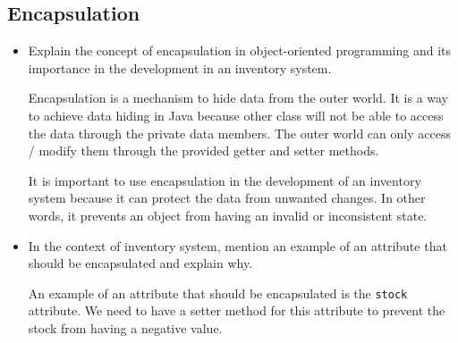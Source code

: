 \documentclass[12pt,titlepage]{article}
\begin{document}
\subsection*{Encapsulation}
\begin{itemize}
    \item {
        Explain the concept of encapsulation in object-oriented programming and its importance
        in the development in an inventory system.

        Encapsulation is a mechanism to hide data from the outer world. It is a way to achieve
        data hiding in Java because other class will not be able to access the data through the
        private data members. The outer world can only access / modify them through the provided
        getter and setter methods.

        It is important to use encapsulation in the development of an inventory system because
        it can protect the data from unwanted changes. In other words, it prevents an object
        from having an invalid or inconsistent state.
    }
    \item {
        In the context of inventory system, mention an example of an attribute that should be encapsulated
        and explain why.

        An example of an attribute that should be encapsulated is the \texttt{stock} attribute.
        We need to have a setter method for this attribute to prevent the stock from having a
        negative value.
    }
\end{itemize}
\end{document}
